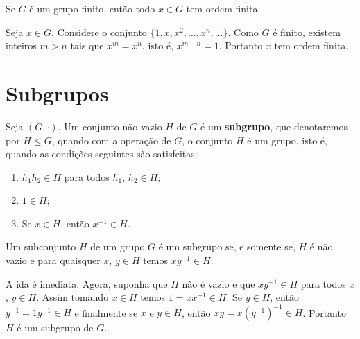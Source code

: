 \begin{proposicao}
	Se $G$ \'e um grupo finito, ent\~ao todo $x \in G$ tem ordem finita.
\end{proposicao}
\begin{prova}
	Seja $x \in G$. Considere o conjunto $\{1, x, x^2, \dots, x^n,\dots\}$. Como $G$ \'e finito, existem inteiros $m > n$ tais que $x^m = x^n$, isto \'e, $x^{m - n} = 1$. Portanto $x$ tem ordem finita.
\end{prova}


\section{Subgrupos} %
\label{sec:subgrupos}
\begin{definicao}
	Seja $(G, \cdot)$. Um conjunto n\~ao vazio $H$ de $G$ \'e um \textbf{subgrupo}, que denotaremos por $H \le G$, quando com a opera\c{c}\~ao de $G$, o conjunto $H$ \'e um grupo, isto \'e, quando as condi\c{c}\~oes seguintes s\~ao satisfeitas:
	\begin{enumerate}[label=({\roman*})]
		\item $h_1h_2 \in H$ para todos $h_1$, $h_2 \in H$;
		\item $1 \in H$;
		\item Se $x \in H$, ent\~ao $x^{-1} \in H$.
	\end{enumerate}
\end{definicao}

\begin{proposicao}
	Um subconjunto $H$ de um grupo $G$ \'e um subgrupo se, e somente se, $H$ \'e n\~ao vazio e para quaisquer $x$, $y \in H$ temos $xy^{-1} \in H$.
\end{proposicao}
\begin{prova}
	A ida \'e imediata. Agora, suponha que $H$ n\~ao \'e vazio e que $xy^{-1} \in H$ para todos $x$, $y \in H$. Assim tomando $x \in H$ temos $1 = xx^{-1} \in H$. Se $y \in H$, ent\~ao $y^{-1} = 1y^{-1} \in H$ e finalmente se $x$ e $y \in H$, ent\~ao $xy = x(y^{-1})^{-1} \in H$. Portanto $H$ \'e um subgrupo de $G$.
\end{prova}

